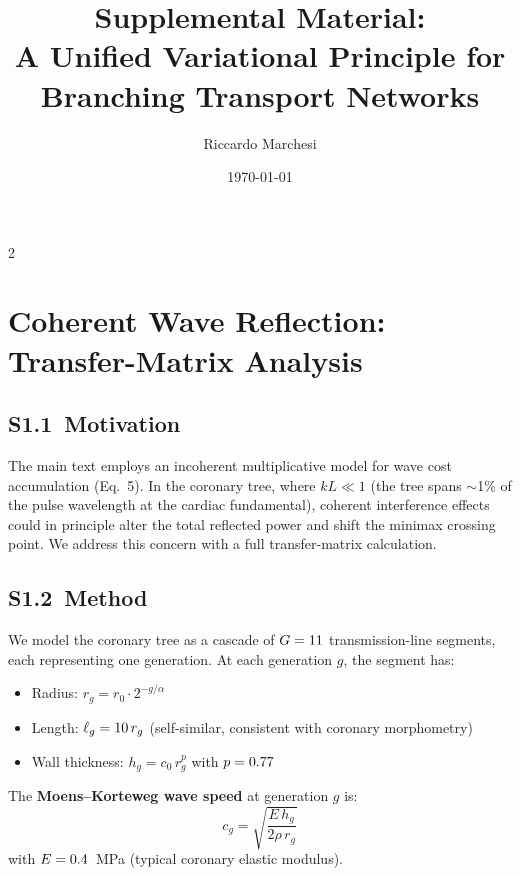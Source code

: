 \documentclass[11pt,a4paper]{article}
\begin{document}
\title{\LARGE\bfseries Supplemental Material:\\[4pt]
A Unified Variational Principle for Branching Transport Networks}
\author{Riccardo Marchesi}
\date{\today}

\maketitle

\begin{multicols}{2}

\section{Coherent Wave Reflection: Transfer-Matrix Analysis}
\label{sec:coherent}

\subsection*{S1.1\ Motivation}

The main text employs an incoherent multiplicative model for wave cost accumulation (Eq.~5). In the coronary tree, where $kL \ll 1$ (the tree spans $\sim$1\% of the pulse wavelength at the cardiac fundamental), coherent interference effects could in principle alter the total reflected power and shift the minimax crossing point. We address this concern with a full transfer-matrix calculation.

\subsection*{S1.2\ Method}

We model the coronary tree as a cascade of $G = 11$ transmission-line segments, each representing one generation. At each generation $g$, the segment has:
\begin{itemize}
\item Radius: $r_g = r_0 \cdot 2^{-g/\alpha}$
\item Length: $\ell_g = 10\,r_g$ (self-similar, consistent with coronary morphometry)
\item Wall thickness: $h_g = c_0\,r_g^p$ with $p = 0.77$
\end{itemize}

The \textbf{Moens--Korteweg wave speed} at generation $g$ is:
\begin{equation}
c_g = \sqrt{\frac{E\,h_g}{2\rho\,r_g}}
\end{equation}
with $E = 0.4$~MPa (typical coronary elastic modulus).


\end{multicols}
\end{document}
